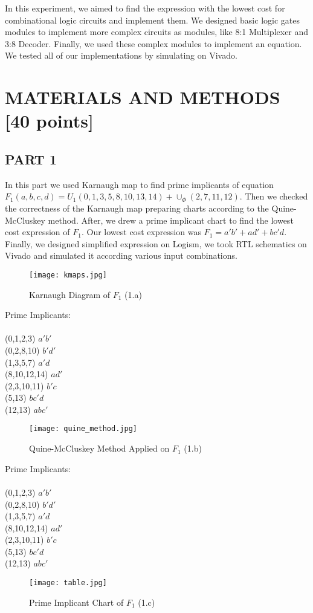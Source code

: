 \documentclass[pdftex,12pt,a4paper]{article}
\begin{document}
In this experiment, we aimed to find the expression with the lowest cost for combinational logic circuits and implement them. We designed basic logic gates modules to implement more complex circuits as modules, like 8:1 Multiplexer and 3:8 Decoder. Finally, we used these complex modules to implement an equation. We tested all of our implementations by simulating on Vivado.

\section{MATERIALS AND METHODS [40 points]}


\subsection{PART 1}
In this part we used Karnaugh map to find prime implicants of equation \(F_1(a, b, c, d) = U_1(0, 1, 3, 5, 8, 10, 13, 14) + \cup_\Phi(2, 7, 11, 12)\). Then we checked the correctness of the Karnaugh map preparing charts according to the Quine-McCluskey method. After, we drew a prime implicant chart to find the lowest cost expression of \(F_1\). Our lowest cost expression was  \(F_1 = a'b' + ad' + bc'd.\)
Finally, we designed simplified expression on Logism, we took RTL schematics on Vivado and simulated it according various input combinations.
\begin{figure}[ht]
	\centering
	\texttt{[image: kmaps.jpg]}	
	\caption{Karnaugh Diagram of \(F_1\) (1.a)}
	\label{fig1}
\end{figure}

Prime Implicants:\\
\\
(0,1,2,3) \(a'b'\)\\
(0,2,8,10) \(b'd'\)\\
(1,3,5,7) \(a'd\)\\
(8,10,12,14) \(ad'\)\\
(2,3,10,11) \(b'c\)\\
(5,13) \(bc'd\)\\
(12,13) \(abc'\)\\



\begin{figure}[ht]
	\centering
	\texttt{[image: quine\_method.jpg]}	
	\caption{Quine-McCluskey Method Applied on \(F_1\) (1.b)}
	\label{fig2}
\end{figure}

Prime Implicants:\\
\\
(0,1,2,3) \(a'b'\)\\
(0,2,8,10) \(b'd'\)\\
(1,3,5,7) \(a'd\)\\
(8,10,12,14) \(ad'\)\\
(2,3,10,11) \(b'c\)\\
(5,13) \(bc'd\)\\
(12,13) \(abc'\)\\
\clearpage
\begin{figure}[ht]
	\centering
	\texttt{[image: table.jpg]}	
	\caption{Prime Implicant Chart of \(F_1\) (1.c)}
	\label{fig3}
\end{figure}
\end{document}
